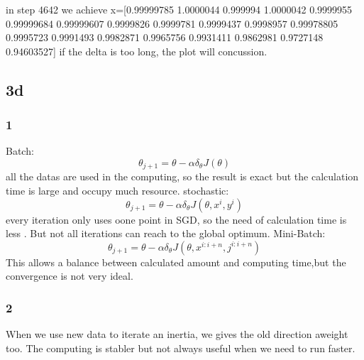 \documentclass{article}
\begin{document}
in step 4642 we achieve x=[0.99999785 1.0000044  0.999994   1.0000042  0.9999955  0.99999684
0.99999607 0.9999826  0.9999781  0.9999437  0.9998957  0.99978805
0.9995723  0.9991493  0.9982871  0.9965756  0.9931411  0.9862981
0.9727148  0.94603527]
if the delta is too long, the plot will concussion. 
\subsection{3d}
\subsubsection{1}
Batch:
$$\theta_{j+1}=\theta-\alpha\delta_\theta J(\theta)$$
all the datas are used in the computing, so the result is exact but the calculation time is large and occupy much resource.
stochastic:
$$\theta_{j+1}=\theta-\alpha\delta_\theta J(\theta,x^i,y^i)$$
every iteration only uses oone point in SGD, so the need of calculation time is less . But not all iterations can reach to the global optimum.
Mini-Batch:
$$\theta_{j+1}=\theta-\alpha\delta_\theta J(\theta,x^{i:i+n},j^{i:i+n})$$
This allows a balance between calculated amount and computing time,but the convergence is not  very ideal.
\subsubsection{2}
When we use new data to iterate an inertia, we gives the old direction aweight too. The computing is stabler but not always useful when we need to run faster.
\end{document}
